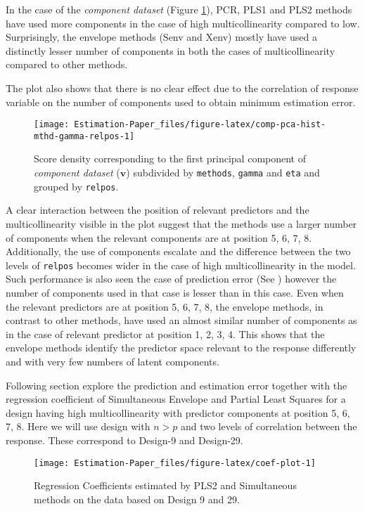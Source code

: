 \documentclass[12pt,3p,authoryear]{elsarticle}
\begin{document}
In the case of the \emph{component dataset} (Figure \ref{fig:comp-pca-hist-mthd-gamma-relpos}), PCR, PLS1 and PLS2 methods have used more components in the case of high multicollinearity compared to low. Surprisingly, the envelope methods (Senv and Xenv) mostly have used a distinctly lesser number of components in both the cases of multicollinearity compared to other methods.

The plot also shows that there is no clear effect due to the correlation of response variable on the number of components used to obtain minimum estimation error.

\begin{figure}[!htb]
\texttt{[image: Estimation-Paper\_files/figure-latex/comp-pca-hist-mthd-gamma-relpos-1]} \caption{Score density corresponding to the first principal component of \emph{component dataset} (\(\mathbf{v}\)) subdivided by \texttt{methods}, \texttt{gamma} and \texttt{eta} and grouped by \texttt{relpos}.}\label{fig:comp-pca-hist-mthd-gamma-relpos}
\end{figure}

A clear interaction between the position of relevant predictors and the multicollinearity visible in the plot suggest that the methods use a larger number of components when the relevant components are at position 5, 6, 7, 8. Additionally, the use of components escalate and the difference between the two levels of \texttt{relpos} becomes wider in the case of high multicollinearity in the model. Such performance is also seen the case of prediction error (See \citet{rimal2019pred}) however the number of components used in that case is lesser than in this case. Even when the relevant predictors are at position 5, 6, 7, 8, the envelope methods, in contrast to other methods, have used an almost similar number of components as in the case of relevant predictor at position 1, 2, 3, 4. This shows that the envelope methods identify the predictor space relevant to the response differently and with very few numbers of latent components.

Following section explore the prediction and estimation error together with the regression coefficient of Simultaneous Envelope and Partial Least Squares for a design having high multicollinearity with predictor components at position 5, 6, 7, 8. Here we will use design with \(n>p\) and two levels of correlation between the response. These correspond to Design-9 and Design-29.

\begin{figure}
\texttt{[image: Estimation-Paper\_files/figure-latex/coef-plot-1]} \caption{Regression Coefficients estimated by PLS2 and Simultaneous methods on the data based on Design 9 and 29.}\label{fig:coef-plot}
\end{figure}
\end{document}
